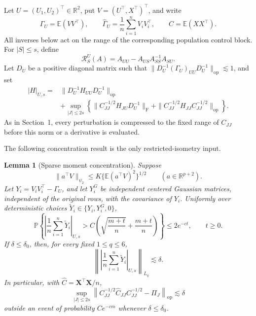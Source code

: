 \documentclass[a4paper,11pt,english]{article}
\newtheorem{lemma}[theorem]{Lemma}
\newcommand{\E}{\mathbb E}
\newcommand{\Prob}{\mathbb P}
\newcommand{\R}{\mathbb R}
\begin{document}
Let $U=(U_1,U_2)^\top\in\R^2$, put $V=(U^\top,X^\top)^\top$, and write
\[
 \Gamma_U=\E(VV^\top),
 \qquad
 \hat\Gamma_U=\frac1n\sum_{i=1}^nV_iV_i^\top,
 \qquad
 C=\E(XX^\top).
\]
All inverses below act on the range of the corresponding population
control block.  For $|S|\le s$, define
\begin{equation}\label{eq:master-residual-map}
 \mathcal R_S^U(A)=A_{UU}-A_{US}A_{SS}^{-1}A_{SU}.
\end{equation}
Let $D_U$ be a positive diagonal matrix such that
$\|D_U^{-1}(\Gamma_U)_{UU}D_U^{-1}\|_{\mathrm{op}}\lesssim1$, and set
\begin{equation}\label{eq:master-sparse-norm}
\begin{split}
 |H|_{U,s}={}&
 \|D_U^{-1}H_{UU}D_U^{-1}\|_{\mathrm{op}}\\
 &+\sup_{|J|\le2s}\left\{
 \|C_{JJ}^{-1/2}H_{JU}D_U^{-1}\|_{\mathrm F}
 +\|C_{JJ}^{-1/2}H_{JJ}C_{JJ}^{-1/2}\|_{\mathrm{op}}
 \right\}.
\end{split}
\end{equation}
As in Section~1, every perturbation is compressed to the fixed range of
$C_{JJ}$ before this norm or a derivative is evaluated.

The following concentration result is the only restricted-isometry input.

\begin{lemma}[Sparse moment concentration]\label{lem:master-concentration}
Suppose
\begin{equation}\label{eq:master-relative-subgaussian}
 \|a^\top V\|_{\psi_2}
 \le K\{\E(a^\top V)^2\}^{1/2}
 \qquad(a\in\R^{p+2}).
\end{equation}
Let $Y_i=V_iV_i^\top-\Gamma_U$, and let $Y_i^G$ be independent centered
Gaussian matrices, independent of the original rows, with the covariance
of $Y_i$.  Uniformly over deterministic choices
$\widetilde Y_i\in\{Y_i,Y_i^G,0\}$,
\begin{equation}\label{eq:master-concentration-tail}
 \Prob\left\{
 \left|\frac1n\sum_{i=1}^n\widetilde Y_i\right|_{U,s}
 >C\left(\sqrt{\frac{m+t}{n}}+\frac{m+t}{n}\right)
 \right\}\le2e^{-ct},
 \qquad t\ge0.
\end{equation}
If $\delta\le\delta_0$, then, for every fixed $1\le q\le6$,
\begin{equation}\label{eq:master-concentration-moments}
 \left\|
 \left|\frac1n\sum_{i=1}^n\widetilde Y_i\right|_{U,s}
 \right\|_{L_q}\lesssim\delta.
\end{equation}
In particular, with $\hat C=\mathbf X^\top\mathbf X/n$,
\begin{equation}\label{eq:master-relative-rip}
 \sup_{|J|\le2s}
 \left\|C_{JJ}^{-1/2}\hat C_{JJ}C_{JJ}^{-1/2}
 -\Pi_J\right\|_{\mathrm{op}}\lesssim\delta
\end{equation}
outside an event of probability $Ce^{-cm}$ whenever
$\delta\le\delta_0$.
\end{lemma}
\end{document}
